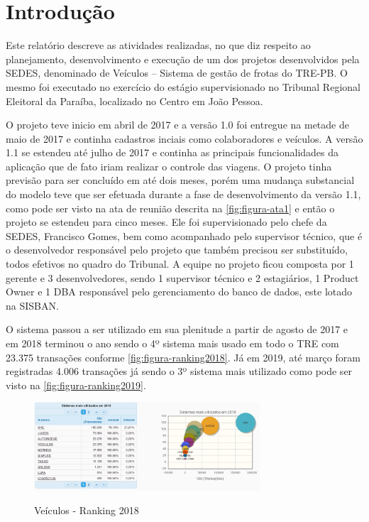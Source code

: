 
\chapter{Introdução}
\label{chap:introducao}

Este relatório descreve as atividades realizadas, no que diz respeito ao planejamento, desenvolvimento e execução de um dos projetos desenvolvidos pela SEDES, denominado de Veículos – Sistema de gestão de frotas do TRE-PB. O mesmo foi executado no exercício do estágio supervisionado no Tribunal Regional Eleitoral da Paraíba, localizado no Centro em João Pessoa.

O projeto teve inicio em abril de 2017 e a versão 1.0 foi entregue na metade de maio de 2017 e continha cadastros inciais como colaboradores e veículos. A versão 1.1 se estendeu até julho de 2017 e continha as principais funcionalidades da aplicação que de fato iriam realizar o controle das viagens. O projeto tinha previsão para ser concluído em até dois meses, porém uma mudança substancial do modelo teve que ser efetuada durante a fase de desenvolvimento da versão 1.1, como pode ser visto na ata de reunião descrita na \autoref{fig:figura-ata1} e então o projeto se estendeu para cinco meses. Ele foi supervisionado pelo chefe da SEDES, Francisco Gomes, bem como acompanhado pelo supervisor técnico, que é o desenvolvedor responsável pelo projeto que também precisou ser substituído, todos efetivos no quadro do Tribunal. A equipe no projeto ficou composta por 1 gerente e 3 desenvolvedores, sendo 1 supervisor técnico e 2 estagiários, 1 Product Owner e 1 DBA responsável pelo gerenciamento do banco de dados, este lotado na SISBAN.

O sistema passou a ser utilizado em sua plenitude a partir de agosto de 2017 e em 2018 terminou o ano sendo o 4º sistema mais usado em todo o TRE com 23.375 transações conforme \autoref{fig:figura-ranking2018}. Já em 2019, até março foram registradas 4.006 transações já sendo o 3º sistema mais utilizado como pode ser visto na \autoref{fig:figura-ranking2019}.

\begin{figure}[!htb]
    \centering
    \caption{Veículos - Ranking 2018}
    \includegraphics[width=0.75\textwidth]{./dados/figuras/ranking2018.png}
    \label{fig:figura-ranking2018}
\end{figure}


